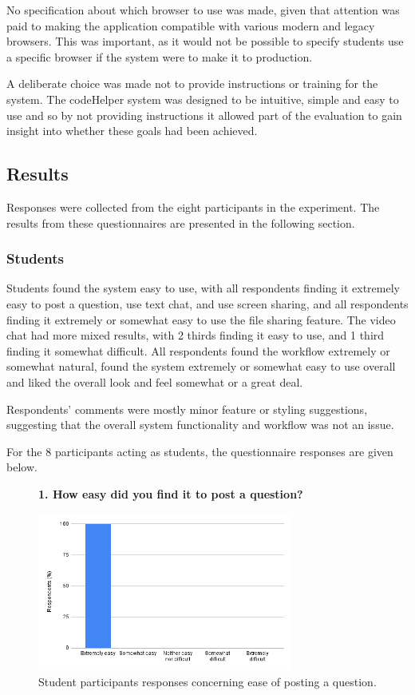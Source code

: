 No specification about which browser to use was made, given that attention was paid to making the application compatible with various modern and legacy browsers. This was important, as it would not be possible to specify students use a specific browser if the system were to make it to production.

A deliberate choice was made not to provide instructions or training for the system. The codeHelper system was designed to be intuitive, simple and easy to use and so by not providing instructions it allowed part of the evaluation to gain insight into whether these goals had been achieved.

\subsection{Results}

Responses were collected from the eight participants in the experiment. The results from these questionnaires are presented in the following section.

\subsubsection{Students}

Students found the system easy to use, with all respondents finding it extremely easy to post a question, use text chat, and use screen sharing, and all respondents finding it extremely or somewhat easy to use the file sharing feature. The video chat had more mixed results, with 2 thirds finding it easy to use, and 1 third finding it somewhat difficult. All respondents found the workflow extremely or somewhat natural, found the system extremely or somewhat easy to use overall and liked the overall look and feel somewhat or a great deal. 

Respondents' comments were mostly minor feature or styling suggestions, suggesting that the overall system functionality and workflow was not an issue.

For the 8 participants acting as students, the questionnaire responses are given below. 

\begin{figure}[H]
    \centering
    \textbf{1. How easy did you find it to post a question?}\par\medskip
    \includegraphics[width=0.75\textwidth]{10evaluation/images/stud1.png}
    \caption{Student participants responses concerning ease of posting a question.}
    \label{fig:stud1}
\end{figure}

